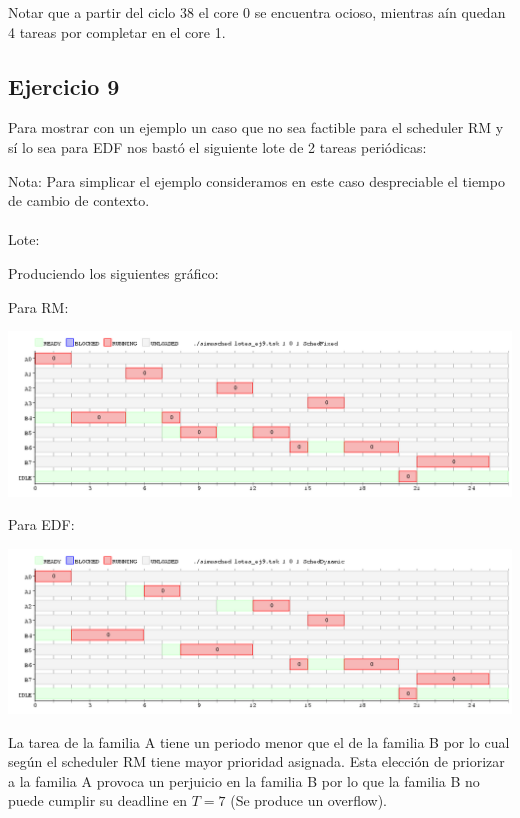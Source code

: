 Notar que a partir del ciclo 38 el core 0 se encuentra ocioso, mientras aín quedan 4 tareas por completar en el core 1.\\


\subsection{Ejercicio 9}

Para mostrar con un ejemplo un caso que no sea factible para el scheduler RM y s\'i lo sea para EDF nos bast\'o el siguiente lote de 2 tareas peri\'odicas:

Nota: Para simplicar el ejemplo consideramos en este caso despreciable el tiempo de cambio de contexto.
\\
\\
Lote:


Produciendo los siguientes gráfico:

Para RM:

\begin{center}
\includegraphics[scale=0.4]{graficos/eje9_fixed.png}
\end{center}

Para EDF:

\begin{center}
\includegraphics[scale=0.4]{graficos/eje9_dynamic.png}
\end{center}

La tarea de la familia A tiene un periodo menor que el de la familia B por lo cual según el scheduler RM tiene mayor prioridad asignada. Esta elección de priorizar a la familia A provoca un perjuicio en la familia B por lo que la familia B no puede cumplir su deadline en $T=7$ (Se produce un overflow).

